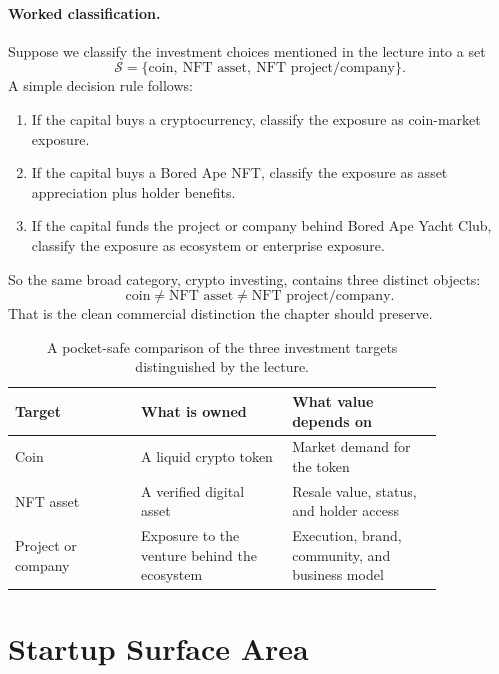 \paragraph{Worked classification.}
Suppose we classify the investment choices mentioned in the lecture into a set
\begin{equation}
\mathcal{S}
=
\{\text{coin},\ \text{NFT asset},\ \text{NFT project/company}\}.
\end{equation}
A simple decision rule follows:

\begin{enumerate}
\item If the capital buys a cryptocurrency, classify the exposure as coin-market exposure.
\item If the capital buys a Bored Ape NFT, classify the exposure as asset appreciation plus holder benefits.
\item If the capital funds the project or company behind Bored Ape Yacht Club, classify the exposure as ecosystem or enterprise exposure.
\end{enumerate}

So the same broad category, crypto investing, contains three distinct objects:
\begin{equation}
\text{coin}
\neq
\text{NFT asset}
\neq
\text{NFT project/company}.
\end{equation}
That is the clean commercial distinction the chapter should preserve.

\begin{table}
\centering
\begin{tabular}{p{0.25\linewidth} p{0.30\linewidth} p{0.30\linewidth}}
\hline
\textbf{Target} & \textbf{What is owned} & \textbf{What value depends on} \\
\hline
Coin & A liquid crypto token & Market demand for the token \\
NFT asset & A verified digital asset & Resale value, status, and holder access \\
Project or company & Exposure to the venture behind the ecosystem & Execution, brand, community, and business model \\
\hline
\end{tabular}
\caption{A pocket-safe comparison of the three investment targets distinguished by the lecture.}
\end{table}

\section{Startup Surface Area}

